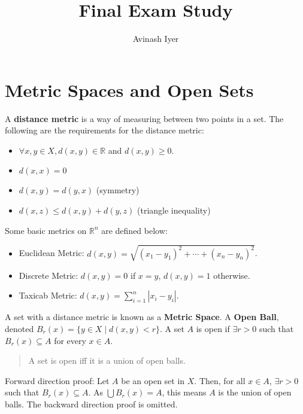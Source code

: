 \documentclass[12pt]{extarticle}
\title{Final Exam Study}
\author{Avinash Iyer}
\date{}
\begin{document}
\section*{Metric Spaces and Open Sets}%
A \textbf{distance metric} is a way of measuring between two points in a set. The following are the requirements for the distance metric:
\begin{itemize}
	\item $\forall x,y\in X, d(x,y)\in \mathbb{R}$ and $d(x,y)\geq 0$.
	\item $d(x,x) = 0$
	\item $d(x,y) = d(y,x)$ (symmetry)
	\item $d(x,z) \leq d(x,y) + d(y,z)$ (triangle inequality)
\end{itemize}
Some basic metrics on $\mathbb{R}^n$ are defined below:
\begin{itemize}
	\item Euclidean Metric: $d(x,y) = \sqrt{(x_1-y_1)^2 + \cdots + (x_n-y_n)^2}$.
	\item Discrete Metric: $d(x,y) = 0$ if $x = y$, $d(x,y) = 1$ otherwise.
	\item Taxicab Metric: $d(x,y) = \sum_{i = 1}^{n}|x_i-y_i|$.
\end{itemize}
A set with a distance metric is known as a \textbf{Metric Space}. A \textbf{Open Ball}, denoted $B_{r}(x) = \{y\in X \mid d(x,y)<r\}$. A set $A$ is open if $\exists r>0$ such that $B_{r}(x)\subseteq A$ for every $x\in A$.
\begin{quote}
	A set is open iff it is a union of open balls.
\end{quote}
Forward direction proof: Let $A$ be an open set in $X$. Then, for all $x\in A$, $\exists r>0$ such that $B_{r}(x) \subseteq A$. As $\bigcup B_{r}(x) = A$, this means $A$ is the union of open balls. The backward direction proof is omitted.\\
\end{document}
